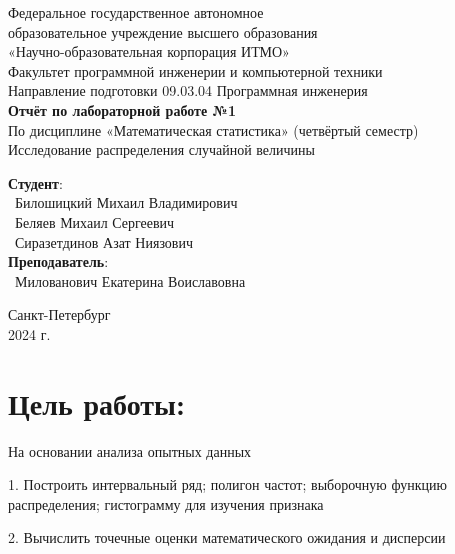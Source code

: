 \documentclass{article}
\begin{document}
\begin{center}
    \Large
    Федеральное государственное автономное \\
    образовательное учреждение высшего образования \\
    «Научно-образовательная корпорация ИТМО»\\
    \vspace{0.5cm}
    \large
    Факультет программной инженерии и компьютерной техники \\
    Направление подготовки 09.03.04 Программная инженерия \\
    \vspace{1cm}
    \Large
    \textbf{Отчёт по лабораторной работе №1} \\
    По дисциплине «Математическая статистика» (четвёртый семестр)\\
    Исследование распределения случайной величины\\
    \large
    \vspace{8cm}

    \begin{minipage}{.33\textwidth}
    \end{minipage}
    \hfill
    \begin{minipage}{.4\textwidth}

        \textbf{Студент}: \vspace{.1cm} \\
        \ Билошицкий Михаил Владимирович\\
        \ Беляев Михаил Сергеевич\\
        \ Сиразетдинов Азат Ниязович\\
        \textbf{Преподаватель}:  \\
        \ Милованович Екатерина Воиславовна
    \end{minipage}
    \vfill
Санкт-Петербург\\ 2024 г.
\end{center}

\newpage
\section*{Цель работы:}
\large

На основании анализа опытных данных

1. Построить интервальный ряд; полигон частот; выборочную функцию распределения; гистограмму для изучения признака

2. Вычислить точечные оценки математического ожидания и дисперсии
\end{document}
